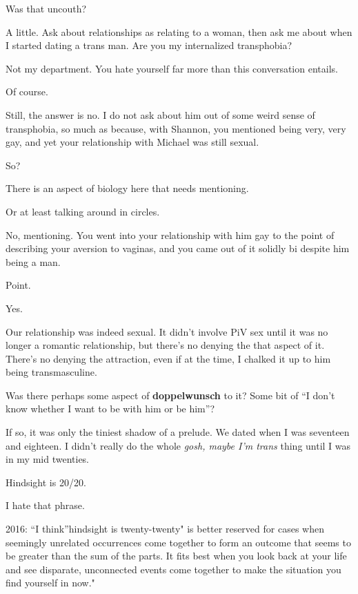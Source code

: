 \begin{paracol}{2}
\begin{leftcolumn}
\begin{ally}
Was that uncouth?
\end{ally}
A little. Ask about relationships as relating to a woman, then ask me about when I started dating a trans man. Are you my internalized transphobia?

\begin{ally}
Not my department. You hate yourself far more than this conversation entails.
\end{ally}
Of course.

\begin{ally}
Still, the answer is no. I do not ask about him out of some weird sense of transphobia, so much as because, with Shannon, you mentioned being very, very gay, and yet your relationship with Michael was still sexual.
\end{ally}
So?

\begin{ally}
There is an aspect of biology here that needs mentioning.
\end{ally}
Or at least talking around in circles.

\begin{ally}
No, mentioning. You went into your relationship with him gay to the point of describing your aversion to vaginas, and you came out of it solidly bi despite him being a man.
\end{ally}
Point.

\begin{ally}
Yes.
\end{ally}
Our relationship was indeed sexual. It didn't involve PiV sex until it was no longer a romantic relationship, but there's no denying the that aspect of it. There's no denying the attraction, even if at the time, I chalked it up to him being transmasculine.

\begin{ally}
Was there perhaps some aspect of \textbf{doppelwunsch} to it? Some bit of ``I don't know whether I want to be with him or be him''?
\end{ally}
If so, it was only the tiniest shadow of a prelude. We dated when I was seventeen and eighteen. I didn't really do the whole \emph{gosh, maybe I'm trans} thing until I was in my mid twenties.

\begin{ally}
Hindsight is 20/20.
\end{ally}
I hate that phrase.

\begin{ally}
2016: ``I think''hindsight is twenty-twenty" is better reserved for cases when seemingly unrelated occurrences come together to form an outcome that seems to be greater than the sum of the parts. It fits best when you look back at your life and see disparate, unconnected events come together to make the situation you find yourself in now."
\end{ally}
\end{leftcolumn}
\end{paracol}

